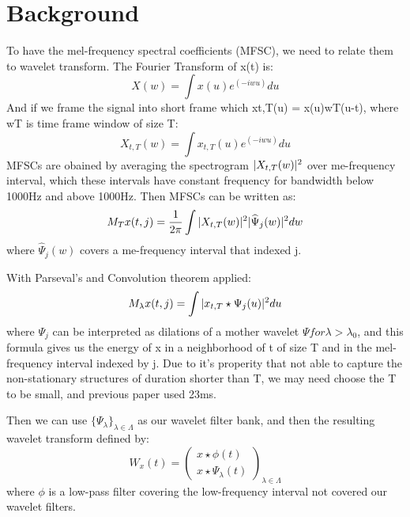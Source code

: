 \documentclass[final]{siamltexmm}
\begin{document}
\section{Background}
To have the mel-frequency spectral coefficients (MFSC), we need to relate them to wavelet transform. The Fourier Transform of x(t) is:
\begin{equation}
X(w)=\int x(u)e^{(-iwu)}du\label{eq1}
\end{equation}
And if we frame the signal into short frame which xt,T(u) = x(u)wT(u-t), where wT is time frame window of size T:
\begin{equation}
X_{t,T}(w)=\int x_{t,T}(u)e^(-iwu)du\label{eq2}
\end{equation}
MFSCs are obained by averaging the spectrogram $\arrowvert X_{t,T}(w)\arrowvert^{2}$ over me-frequency interval, which these intervals have constant frequency for bandwidth below 1000Hz and above 1000Hz. Then MFSCs can be written as:
\begin{equation}
M_{T}x(t,j)=\frac{1}{2\pi} \int \arrowvert X_{t,T}(w)\arrowvert^{2} \arrowvert \widehat{\Psi}_{j}(w) \arrowvert^{2} dw\label{eq3}
\end{equation}
where $\widehat{\Psi}_{j}(w)$ covers a me-frequency interval that indexed j.

With Parseval’s and Convolution theorem  applied:
\begin{equation}
M_{\lambda}x(t,j)=\int \arrowvert x_{t,T} \star \Psi_{j}(u) \arrowvert^{2} du\label{eq4}
\end{equation}
where $\Psi_{j}$ can be interpreted as dilations of a mother wavelet $\Psi for \lambda > \lambda_{0}$, and this formula gives us the energy of x in a neighborhood of t of size T and in the mel-frequency interval indexed by j. Due to it’s properity that not able to capture the non-stationary structures of duration shorter than T, we may need choose the T to be small, and previous paper used 23ms.
  
Then we can use $\{ \Psi_{\lambda}\}_{\lambda \in \Lambda}$ as our wavelet filter bank, and then the resulting wavelet transform defined by:
\begin{equation}
W_{x}(t)=\left( \begin{array}{cc}
x \star \phi(t) \\
x \star \Psi_{\lambda}(t)
\end{array} \right)_{\lambda \in \Lambda}\label{eq5}
\end{equation}
where $\phi$ is a low-pass filter covering the low-frequency interval not covered our wavelet filters.
\end{document}

